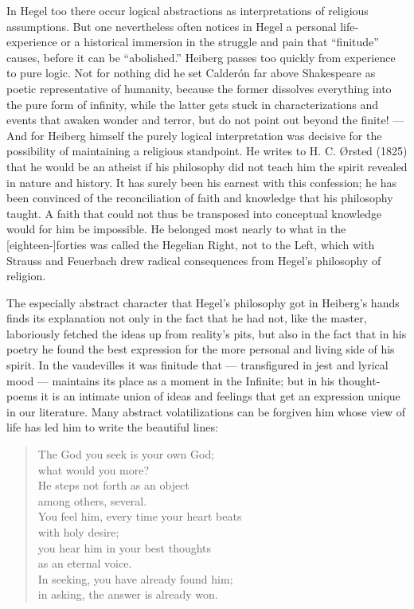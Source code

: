 \documentclass[12pt,a4paper]{book}
\newcommand{\opage}[1]{\marginnote{\footnotesize\textit{[#1]}}}
\begin{document}
In Hegel too there occur logical abstractions as interpretations of religious assumptions. But one
nevertheless often notices in Hegel a personal life-experience or a historical immersion in the
struggle and pain that ``finitude'' causes, before it can be ``abolished.'' Heiberg passes too
quickly from experience to pure logic. Not for nothing did he set Calderón far above Shakespeare
as poetic representative of humanity, because the former dissolves everything into the pure form
of infinity, while the latter gets stuck in characterizations and events that awaken wonder and
terror, but do not point out beyond the finite! --- And for Heiberg himself the purely logical
interpretation was decisive for the possibility of maintaining a religious standpoint. He writes
to H. C. Ørsted (1825) that he would be an atheist if his philosophy did not teach him \opage{136}the spirit
revealed in nature and history. It has surely been his earnest with this confession; he has been
convinced of the reconciliation of faith and knowledge that his philosophy taught. A faith that
could not thus be transposed into conceptual knowledge would for him be impossible. He belonged
most nearly to what in the [eighteen-]forties was called the Hegelian Right, not to the Left,
which with Strauss and Feuerbach drew radical consequences from Hegel's philosophy of religion.

The especially abstract character that Hegel's philosophy got in Heiberg's hands finds its
explanation not only in the fact that he had not, like the master, laboriously fetched the ideas
up from reality's pits, but also in the fact that in his poetry he found the best expression for
the more personal and living side of his spirit. In the vaudevilles it was finitude that ---
transfigured in jest and lyrical mood --- maintains its place as a moment in the Infinite; but in
his thought-poems it is an intimate union of ideas and feelings that get an expression unique in
our literature. Many abstract volatilizations can be forgiven him whose view of life has led him
to write the beautiful lines:

\begin{verse}
The God you seek is your own God;\\
what would you more?\\
He steps not forth as an object\\
among others, several.\\
You feel him, every time your heart beats\\
with holy desire;\\
you hear him in your best thoughts\\
as an eternal voice.\\
In seeking, you have already found him;\\
in asking, the answer is already won.
\end{verse}
\end{document}

